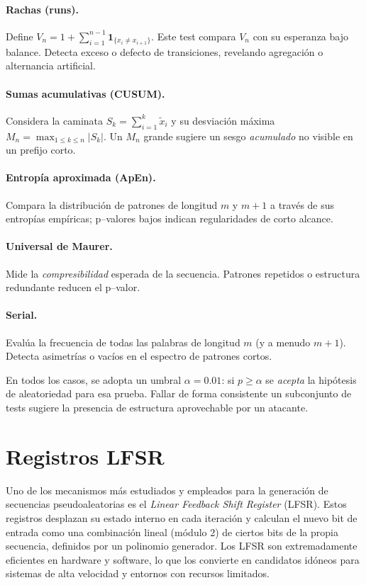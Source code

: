 \paragraph{Rachas (runs).}
Define $V_n = 1 + \sum_{i=1}^{n-1} \mathbf{1}_{\{x_i \neq x_{i+1}\}}$. Este test
compara $V_n$ con su esperanza bajo balance. Detecta exceso o defecto de
transiciones, revelando agregación o alternancia artificial.

\paragraph{Sumas acumulativas (CUSUM).}
Considera la caminata $S_k=\sum_{i=1}^k \tilde{x}_i$ y su desviación máxima
$M_n=\max_{1\le k\le n}|S_k|$. Un $M_n$ grande sugiere un sesgo \emph{acumulado}
no visible en un prefijo corto.

\paragraph{Entropía aproximada (ApEn).}
Compara la distribución de patrones de longitud $m$ y $m{+}1$ a través de sus
entropías empíricas; p--valores bajos indican regularidades de corto alcance.

\paragraph{Universal de Maurer.}
Mide la \emph{compresibilidad} esperada de la secuencia. Patrones repetidos o
estructura redundante reducen el p--valor.

\paragraph{Serial.}
Evalúa la frecuencia de todas las palabras de longitud $m$ (y a menudo $m{+}1$).
Detecta asimetrías o vacíos en el espectro de patrones cortos.

\medskip
En todos los casos, se adopta un umbral $\alpha=0.01$: si $p\ge \alpha$ se
\emph{acepta} la hipótesis de aleatoriedad para esa prueba. Fallar de forma
consistente un subconjunto de tests sugiere la presencia de estructura
aprovechable por un atacante.


\section*{Registros LFSR}

Uno de los mecanismos más estudiados y empleados para la generación de
secuencias pseudoaleatorias es el \textit{Linear Feedback Shift Register}
(LFSR). Estos registros desplazan su estado interno en cada iteración y
calculan el nuevo bit de entrada como una combinación lineal (módulo 2) de
ciertos bits de la propia secuencia, definidos por un polinomio generador. Los
LFSR son extremadamente eficientes en hardware y software, lo que los convierte
en candidatos idóneos para sistemas de alta velocidad y entornos con recursos
limitados.

